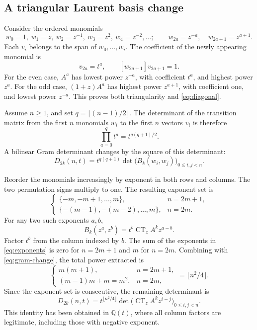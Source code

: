 \documentclass[11pt,a4paper]{article}
\theoremstyle{definition}
\theoremstyle{remark}
\newcommand{\CT}{\operatorname{CT}_z}
\newcommand{\Q}{\mathbb Q}
\numberwithin{equation}{section}
\begin{document}
\subsection{A triangular Laurent basis change}
Consider the ordered monomials
\begin{equation}
 w_0=1,\ w_1=z,\ w_2=z^{-1},\ w_3=z^2,\ w_4=z^{-2},\ldots;
 \qquad w_{2a}=z^{-a},\quad w_{2a+1}=z^{a+1}.
 \label{eq:laurent-basis}
\end{equation}
Each \(v_i\) belongs to the span of \(w_0,\ldots,w_i\). The coefficient
of the newly appearing monomial is
\begin{equation}
 [w_{2a}]v_{2a}=t^a,\qquad [w_{2a+1}]v_{2a+1}=1.
 \label{eq:diagonal}
\end{equation}
For the even case, \(A^a\) has lowest power \(z^{-a}\), with coefficient
\(t^a\), and highest power \(z^a\). For the odd case,
\((1+z)A^a\) has highest power \(z^{a+1}\), with coefficient one, and
lowest power \(z^{-a}\). This proves both triangularity and
\eqref{eq:diagonal}.

Assume \(n\ge1\), and set \(q=\lfloor(n-1)/2\rfloor\). The determinant
of the transition matrix from the first \(n\) monomials \(w_i\) to the
first \(n\) vectors \(v_i\) is therefore
\[
 \prod_{a=0}^{q}t^a=t^{q(q+1)/2}.
\]
A bilinear Gram determinant changes by the square of this determinant:
\begin{equation}
 D_{2k}(n,t)=t^{q(q+1)}
 \det\bigl(B_k(w_i,w_j)\bigr)_{0\le i,j<n}.
 \label{eq:gram-change}
\end{equation}

Reorder the monomials increasingly by exponent in both rows and columns.
The two permutation signs multiply to one. The resulting exponent set is
\begin{equation}
 \begin{cases}
 \{-m,-m+1,\ldots,m\},&n=2m+1,\\
 \{-(m-1),-(m-2),\ldots,m\},&n=2m.
 \end{cases}
 \label{eq:exponents}
\end{equation}
For any two such exponents \(a,b\),
\begin{equation}
 B_k(z^a,z^b)=t^b\CT A^kz^{a-b}.
 \label{eq:monomial-gram}
\end{equation}
Factor \(t^b\) from the column indexed by \(b\). The sum of the exponents
in \eqref{eq:exponents} is zero for \(n=2m+1\) and \(m\) for \(n=2m\).
Combining with \eqref{eq:gram-change}, the total power extracted is
\begin{equation}
 \begin{cases}
 m(m+1),&n=2m+1,\\
 (m-1)m+m=m^2,&n=2m,
 \end{cases}
 =\lfloor n^2/4\rfloor.
 \label{eq:power-audit}
\end{equation}
Since the exponent set is consecutive, the remaining determinant is
\begin{equation}
 D_{2k}(n,t)=t^{\lfloor n^2/4\rfloor}
 \det\bigl(\CT A^kz^{i-j}\bigr)_{0\le i,j<n}.
 \label{eq:toeplitz}
\end{equation}
This identity has been obtained in \(\Q(t)\), where all column factors are
legitimate, including those with negative exponent.
\end{document}
